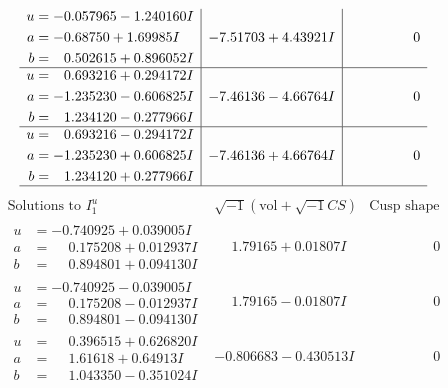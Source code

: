 \documentclass[1p]{elsarticle_modified}
\theoremstyle{definition}
\newcommand{\I}{\sqrt{-1}}
\begin{document}
$$\begin{array}{c|c|c}
\begin{aligned}
u &= -0.057965 - 1.240160 I \\
a &= -0.68750 + 1.69985 I \\
b &= \phantom{-}0.502615 + 0.896052 I\end{aligned}
 & -7.51703 + 4.43921 I & \phantom{-0.000000 } 0 \\ \hline\begin{aligned}
u &= \phantom{-}0.693216 + 0.294172 I \\
a &= -1.235230 - 0.606825 I \\
b &= \phantom{-}1.234120 - 0.277966 I\end{aligned}
 & -7.46136 - 4.66764 I & \phantom{-0.000000 } 0 \\ \hline\begin{aligned}
u &= \phantom{-}0.693216 - 0.294172 I \\
a &= -1.235230 + 0.606825 I \\
b &= \phantom{-}1.234120 + 0.277966 I\end{aligned}
 & -7.46136 + 4.66764 I & \phantom{-0.000000 } 0\\
 \hline 
 \end{array}$$\newpage$$\begin{array}{c|c|c}  
\text{Solutions to }I^u_{1}& \I (\text{vol} + \sqrt{-1}CS) & \text{Cusp shape}\\
 \hline 
\begin{aligned}
u &= -0.740925 + 0.039005 I \\
a &= \phantom{-}0.175208 + 0.012937 I \\
b &= \phantom{-}0.894801 + 0.094130 I\end{aligned}
 & \phantom{-}1.79165 + 0.01807 I & \phantom{-0.000000 } 0 \\ \hline\begin{aligned}
u &= -0.740925 - 0.039005 I \\
a &= \phantom{-}0.175208 - 0.012937 I \\
b &= \phantom{-}0.894801 - 0.094130 I\end{aligned}
 & \phantom{-}1.79165 - 0.01807 I & \phantom{-0.000000 } 0 \\ \hline\begin{aligned}
u &= \phantom{-}0.396515 + 0.626820 I \\
a &= \phantom{-}1.61618 + 0.64913 I \\
b &= \phantom{-}1.043350 - 0.351024 I\end{aligned}
 & -0.806683 - 0.430513 I & \phantom{-0.000000 } 0 \\ \hline\begin{aligned}

\end{aligned}
\end{array}$$
\end{document}
